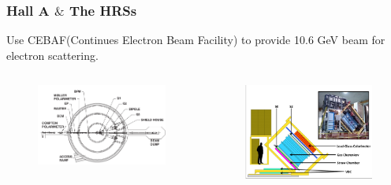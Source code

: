\documentclass{beamer}
\begin{document}
\begin{frame}
\frametitle{Hall A $\&$ The HRSs}

\begin{block}{}
	Use CEBAF(Continues Electron Beam Facility) to provide 10.6 GeV beam for electron scattering. 
\end{block}
\vspace{-20pt}
\begin{columns}
\begin{figure}
	\includegraphics[width=6cm]{../images/HallA_draw}
\end{figure}
\begin{figure}
	\includegraphics[width=6cm]{../images/HRS_cartoon}
\end{figure}

\end{columns}
\end{frame}
\end{document}
